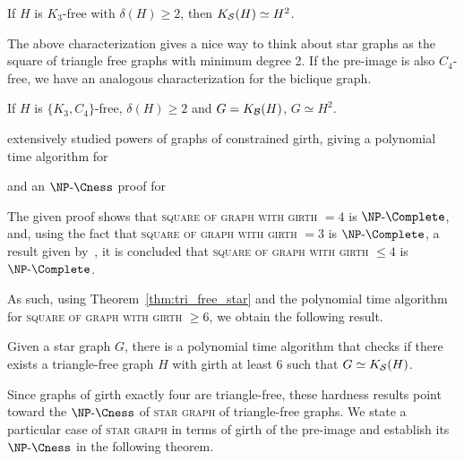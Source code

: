 \begin{corollary}
    If $H$ is $K_3$-free with  $\delta(H) \geq 2$, then $K_{\mathcal{S}}(H) \simeq H^2$.
\end{corollary}

The above characterization gives a nice way to think about star graphs as the square of triangle free graphs with minimum degree 2.
If the pre-image is also $C_4$-free, we have an analogous characterization for the biclique graph.

\begin{corollary}
    If $H$ is $\{K_3, C_4\}$-free, $\delta(H) \geq 2$ and $G = K_{\mathcal{B}}(H)$, $G \simeq H^2$.
\end{corollary}

\citep{girth_powers} extensively studied powers of graphs of constrained girth, giving a polynomial time algorithm for 


and an $\NPcness$ proof for


The given proof shows that \textsc{square of graph with girth $= 4$} is $\NPc$, and, using the fact that \textsc{square of graph with girth $= 3$} is $\NPc$, a result given by~\citep{hard_roots}, it is concluded that \textsc{square of graph with girth $\leq 4$} is $\NPc$.

As such, using Theorem~\ref{thm:tri_free_star} and the polynomial time algorithm for \textsc{square of graph with girth $\geq 6$}, we obtain the following result.

\begin{theorem}
    Given a star graph $G$, there is a polynomial time algorithm that checks if there exists a triangle-free graph $H$ with girth at least 6 such that $G \simeq K_{\mathcal{S}}(H)$.
\end{theorem}

Since graphs of girth exactly four are triangle-free, these hardness results point toward the $\NPcness$ of \textsc{star graph} of triangle-free graphs.
We state a particular case of \textsc{star graph} in terms of girth of the pre-image and establish its $\NPcness$ in the following theorem.


